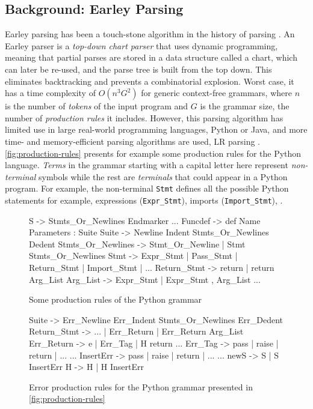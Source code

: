 \subsection{Background: Earley Parsing}
\label{sec:overview:earleyparsing}

 Earley parsing has been a touch-stone algorithm in the
history of parsing \citep{?}. An Earley parser is a \emph{top-down chart parser}
that uses dynamic programming, meaning that partial parses are stored in a data
structure called a chart, which can later be re-used, and the parse tree is
built from the top down. This eliminates backtracking and prevents a
combinatorial explosion. Worst case, it has a time complexity of $O(n^3 G^2)$
for generic context-free grammars, where $n$ is the number of \emph{tokens} of
the input program and $G$ is the grammar size, \ie the number of
\emph{production rules} it includes. However, this parsing algorithm has limited
use in large real-world programming languages, \eg Python or Java, and more
time- and memory-efficient parsing algorithms are used, \eg LR parsing \etc
\citep{?}. \autoref{fig:production-rules} presents for example some production
rules for the Python language. \emph{Terms} in the grammar starting with a
capital letter here represent \emph{non-terminal} symbols while the rest are
\emph{terminals} that could appear in a Python program. For example, the
non-terminal \texttt{Stmt} defines all the possible Python statements for
example, \ie expressions (\texttt{Expr\_Stmt}), imports (\texttt{Import\_Stmt}),
\etc.

\begin{figure}[ht]
\begin{ecode}
S -> Stmts_Or_Newlines Endmarker
...
Funcdef -> def Name Parameters : Suite
Suite -> Newline Indent Stmts_Or_Newlines Dedent
Stmts_Or_Newlines -> Stmt_Or_Newline | Stmt Stmts_Or_Newlines
Stmt -> Expr_Stmt | Pass_Stmt | Return_Stmt | Import_Stmt | ...
Return_Stmt -> return | return Arg_List
Arg_List -> Expr_Stmt | Expr_Stmt , Arg_List
...
\end{ecode}
\caption{Some production rules of the Python grammar}
\label{fig:production-rules}
\end{figure}

\begin{figure}[ht]
\begin{ecode}
Suite -> Err_Newline Err_Indent Stmts_Or_Newlines Err_Dedent
Return_Stmt -> ... | Err_Return | Err_Return Arg_List
Err_Return -> e | Err_Tag | H return
...
Err_Tag -> pass | raise | return | ...
...
InsertErr -> pass | raise | return | ...
...
newS -> S | S InsertErr
H -> H | H InsertErr
\end{ecode}
\caption{Error production rules for the Python grammar presented in
\autoref{fig:production-rules}}
\label{fig:error-rules}
\end{figure}


